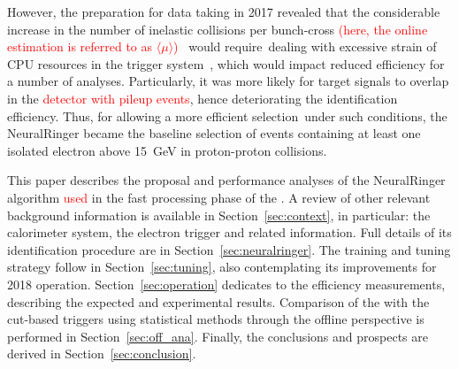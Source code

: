 However, the preparation for data taking in 2017 revealed that the considerable increase in the number of inelastic collisions per bunch-cross \textcolor{red}{(here, the online estimation is referred to as $\langle \mu \rangle$)}~\cite{DAPR-2013-01} would require dealing with excessive strain of CPU resources in the trigger system~\cite{ATL-DAQ-PUB-2018-002}, which would impact reduced efficiency for a number of analyses. Particularly, it was more likely for target  signals to overlap in the \textcolor{red}{detector with pileup events}, hence deteriorating the identification efficiency. Thus, for allowing a more efficient selection under such conditions, the NeuralRinger became the baseline selection of events containing at least one isolated electron above \SI{15}{\GeV} in proton-proton collisions.




This paper describes the proposal and performance analyses of the NeuralRinger
algorithm \textcolor{red}{used} in the fast processing phase of the \hlt{}. A review
of other relevant background information is available in
Section~\ref{sec:context}, in particular: the calorimeter system, the electron
trigger and related information. Full details of its identification procedure are
in Section~\ref{sec:neuralringer}. The training and tuning strategy follow in
Section~\ref{sec:tuning}, also contemplating its improvements for 2018
operation. Section~\ref{sec:operation} dedicates to the efficiency measurements,
describing the expected and experimental results. Comparison of the \rnn with
the cut-based triggers using statistical methods through the offline perspective
is performed in Section~\ref{sec:off_ana}. %
Finally, the conclusions and prospects are derived in Section~\ref{sec:conclusion}.


